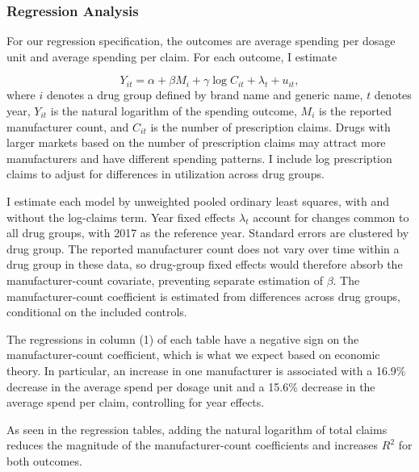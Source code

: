 \documentclass[12pt]{article}
\begin{document}
\newpage

\subsubsection{Regression Analysis}

For our regression specification, the outcomes are average spending per dosage unit and average spending per claim. For each outcome, I estimate

\[
Y_{it}=\alpha+\beta M_i+\gamma\log C_{it}+\lambda_t+u_{it},
\]
where $i$ denotes a drug group defined by brand name and generic name, $t$ denotes year, $Y_{it}$ is the natural logarithm of the spending outcome, $M_i$ is the reported manufacturer count, and $C_{it}$ is the number of prescription claims. Drugs with larger markets based on the number of prescription claims may attract more manufacturers and have different spending patterns. I include log prescription claims to adjust for differences in utilization across drug groups.

I estimate each model by unweighted pooled ordinary least squares, with and without the log-claims term. Year fixed effects $\lambda_t$ account for changes common to all drug groups, with 2017 as the reference year. Standard errors are clustered by drug group. The reported manufacturer count does not vary over time within a drug group in these data, so drug-group fixed effects would therefore absorb the manufacturer-count covariate, preventing separate estimation of $\beta$. The manufacturer-count coefficient is estimated from differences across drug groups, conditional on the included controls.


\FloatBarrier

\FloatBarrier


\FloatBarrier

The regressions in column (1) of each table have a negative sign on the manufacturer-count coefficient, which is what we expect based on economic theory. In particular, an increase in one manufacturer is associated with a 16.9\% decrease in the average spend per dosage unit and a 15.6\% decrease in the average spend per claim, controlling for year effects.

As seen in the regression tables, adding the natural logarithm of total claims reduces the magnitude of the manufacturer-count coefficients and increases $R^2$ for both outcomes.
\end{document}

